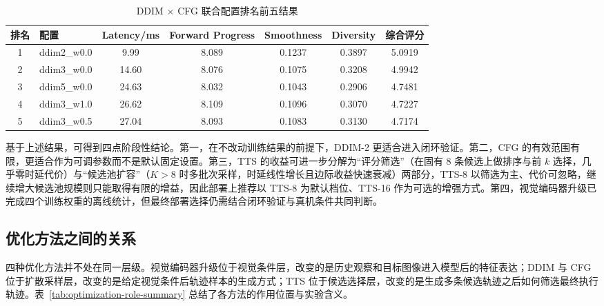 \begin{table}[htbp]
    \centering
    \caption{DDIM $\times$ CFG 联合配置排名前五结果}
    \label{tab:joint-ddim-cfg}
    \begin{tabular}{clccccc}
        \toprule
        排名 & 配置 & Latency/ms & Forward Progress & Smoothness & Diversity & 综合评分 \\
        \midrule
        1 & ddim2\_w0.0 & 9.99 & 8.089 & 0.1237 & 0.3897 & 5.0919 \\
        2 & ddim3\_w0.0 & 14.60 & 8.076 & 0.1075 & 0.3208 & 4.9942 \\
        3 & ddim5\_w0.0 & 24.63 & 8.032 & 0.1043 & 0.2906 & 4.7481 \\
        4 & ddim3\_w1.0 & 26.62 & 8.109 & 0.1096 & 0.3070 & 4.7227 \\
        5 & ddim3\_w0.5 & 27.04 & 8.093 & 0.1083 & 0.3130 & 4.7174 \\
        \bottomrule
    \end{tabular}
\end{table}

基于上述结果，可得到四点阶段性结论。第一，在不改动训练结果的前提下，DDIM-2 更适合进入闭环验证。第二，CFG 的有效范围有限，更适合作为可调参数而不是默认固定设置。第三，TTS 的收益可进一步分解为``评分筛选''（在固有 8 条候选上做排序与前 $k$ 选择，几乎零时延代价）与``候选池扩容''（$K>8$ 时多批次采样，时延线性增长且边际收益快速衰减）两部分，TTS-8 以筛选为主、代价可忽略，继续增大候选池规模则只能取得有限的增益，因此部署上推荐以 TTS-8 为默认档位、TTS-16 作为可选的增强方式。第四，视觉编码器升级已完成四个训练权重的离线统计，但最终部署选择仍需结合闭环验证与真机条件共同判断。

\subsection{优化方法之间的关系}

四种优化方法并不处在同一层级。视觉编码器升级位于视觉条件层，改变的是历史观察和目标图像进入模型后的特征表达；DDIM 与 CFG 位于扩散采样层，改变的是给定视觉条件后轨迹样本的生成方式；TTS 位于候选选择层，改变的是生成多条候选轨迹之后如何筛选最终执行轨迹。表~\ref{tab:optimization-role-summary} 总结了各方法的作用位置与实验含义。

